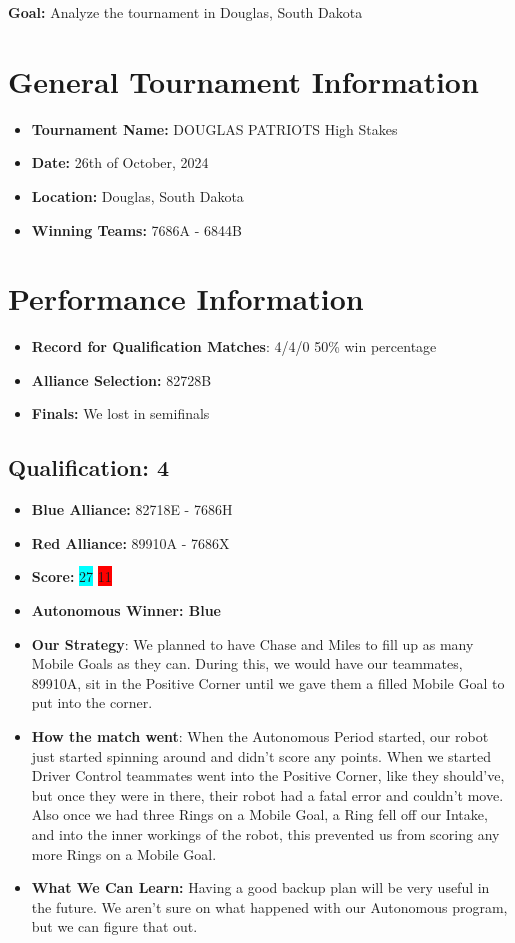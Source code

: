 \textbf{Goal:} Analyze the tournament in Douglas, South Dakota
\section*{General Tournament Information}
\begin{itemize}
    \item \textbf{Tournament Name:} DOUGLAS PATRIOTS High Stakes
    \item \textbf{Date:} 26th of October, 2024
    \item \textbf{Location:} Douglas, South Dakota
    \item \textbf{Winning Teams:} 7686A  - 6844B
\end{itemize}

\section*{Performance Information}
\begin{itemize}
    \item \textbf{Record for Qualification Matches}: 4/4/0 50\% win percentage
    \item \textbf{Alliance Selection:} 82728B
    \item \textbf{Finals:} We lost in semifinals
\end{itemize}
\subsection*{Qualification: 4}

\begin{itemize}
    \item \textbf{Blue Alliance:} 82718E - 7686H
    \item \textbf{Red Alliance:} 89910A - 7686X
    \item \textbf{Score:} \colorbox{cyan}{27} \colorbox{red}{11}
    \item \textbf{Autonomous Winner: Blue}
    \item \textbf{Our Strategy}: We planned to have Chase and Miles to fill up as many Mobile Goals as they can. During this, we would have our teammates, 89910A, sit in the Positive Corner until we gave them a filled Mobile Goal to put into the corner. 
    \item \textbf{How the match went}: When the Autonomous Period started, our robot just started spinning around and didn't score any points. When we started Driver Control teammates went into the Positive Corner, like they should've, but once they were in there, their robot had a fatal error and couldn't move. Also once we had three Rings on a Mobile Goal, a Ring fell off our Intake, and into the inner workings of the robot, this prevented us from scoring any more Rings on a Mobile Goal.
    \item \textbf{What We Can Learn:} Having a good backup plan will be very useful in the future. We aren't sure on what happened with our Autonomous program, but we can figure that out.
\end{itemize}

